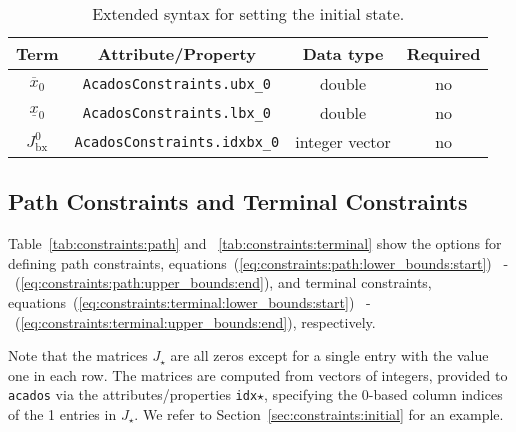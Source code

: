 \documentclass[english]{article}
\newcommand{\code}[1]{\texttt{#1}}
\newcommand{\acados}{\texttt{acados}}
\newcommand{\ind}[1]{_{\textrm{#1}}}
\newcommand{\initial}{^{\textrm{0}}}
\newcommand{\optional}{no}
\begin{document}
\begin{table}[ht!]
    \centering
    \begin{tabular}{cccc}
        \toprule
        Term & Attribute/Property & Data type & Required \\ \midrule
        $ \overline{x}_0 $ & \code{AcadosConstraints.ubx\_0} & double & \optional \\
        $ \underline{x}_0 $ & \code{AcadosConstraints.lbx\_0} & double & \optional \\
        $ J\ind{bx}\initial$ & \code{AcadosConstraints.idxbx\_0} & integer vector & \optional \\
        \bottomrule
    \end{tabular}
    \caption{Extended syntax for setting the initial state.} \label{tab:constraints:extendedsyntax}
\end{table}
%
\subsection{Path Constraints and Terminal Constraints}\label{sec:constraints:path}
%
Table~\ref{tab:constraints:path} and ~\ref{tab:constraints:terminal} show the options for defining path constraints, equations~(\ref{eq:constraints:path:lower_bounds:start}) ~-~(\ref{eq:constraints:path:upper_bounds:end}), and terminal constraints, equations~(\ref{eq:constraints:terminal:lower_bounds:start}) ~-~(\ref{eq:constraints:terminal:upper_bounds:end}), respectively.

Note that the matrices $J_{\star}$ are all zeros except for a single entry with the value one in each row.
The matrices are computed from vectors of integers, provided to \acados{} via the attributes/properties \texttt{idx}$\star$, specifying the 0-based column indices of the 1 entries in $J_{\star}$.
We refer to Section~\ref{sec:constraints:initial} for an example.
\end{document}
